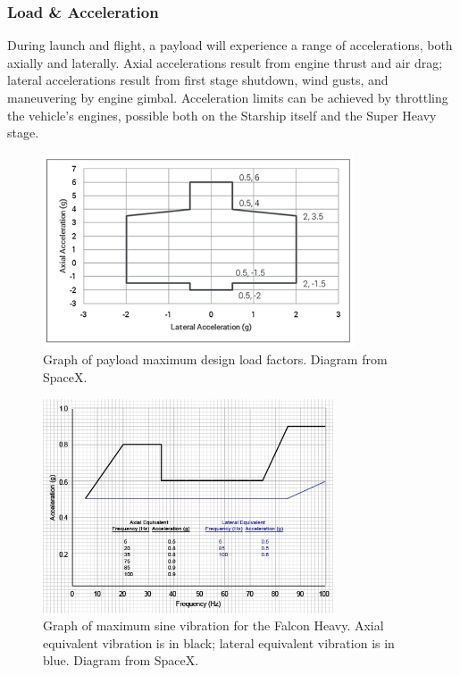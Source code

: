 \documentclass[11pt]{article}
\begin{document}
\subsubsection{Load \& Acceleration}
During launch and flight, a payload will experience a range of accelerations, both axially and laterally. Axial accelerations result from engine thrust and air drag; lateral accelerations result from first stage shutdown, wind gusts, and maneuvering by engine gimbal. Acceleration limits can be achieved by throttling the vehicle's engines, possible both on the Starship itself and the Super Heavy stage.

\begin{figure}[!b]
    \centering
    \includegraphics[height=2.25in]{assets/PayloadLoadMax.png}
    \caption{Graph of payload maximum design load factors. Diagram from SpaceX.}
    \label{fig:PayloadLoads}
\end{figure}

\begin{figure}[!t]
    \centering
    \includegraphics[height=2.5in]{assets/SineVibration.png}
    \caption{Graph of maximum sine vibration for the Falcon Heavy.  Axial equivalent vibration is in black; lateral equivalent vibration is in blue. Diagram from SpaceX.}
    \label{fig:SineVibration}
\end{figure}
\end{document}
